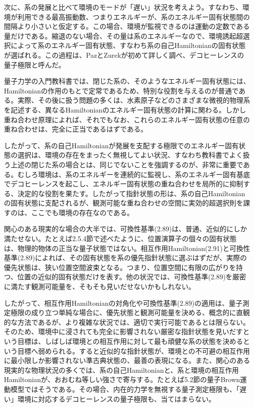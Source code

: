 \hypertarget{srcpage:81}{}\label{srcpage:81}
次に、系の発展と比べて環境のモードが「遅い」状況を考えよう。すなわち、環境が利用できる最高振動数、つまりエネルギーが、系のエネルギー固有状態間の間隔より小さいと仮定する。この場合、環境が監視できるのは運動の定数である量だけである。縮退のない場合、その量は系のエネルギーなので、環境誘起超選択によって系のエネルギー固有状態、すなわち系の自己Hamiltonianの固有状態が選ばれる。この過程は、PazとZurek\cite{ref103}が初めて詳しく調べ、デコヒーレンスの量子極限と呼んだ。

量子力学の入門教科書では、閉じた系の、そのようなエネルギー固有状態には、Hamiltonianの作用のもとで定常であるため、特別な役割を与えるのが普通である。実際、その後に扱う問題の多くは、水素原子などのさまざまな微視的物理系を記述する、異なるHamiltonianのエネルギー固有状態の計算に関わる。しかし重ね合わせ原理によれば、それでもなお、これらのエネルギー固有状態の任意の重ね合わせは、完全に正当であるはずである。

したがって、系の自己Hamiltonianが発展を支配する極限でのエネルギー固有状態の選択は、環境の存在をまったく無視してよい状況、すなわち教科書でよく扱う上述の閉じた系の場合とは、同じでないことを強調するのが、非常に重要である。むしろ環境は、系のエネルギーを連続的に監視し、系のエネルギー固有基底でデコヒーレンスを起こし、エネルギー固有状態の重ね合わせを局所的に抑制する、決定的な役割を果たす。したがって指針状態の形は、系の自己Hamiltonianの固有状態に支配されるが、観測可能な重ね合わせの空間に実効的超選択則を課すのは、ここでも環境の存在なのである。

関心のある現実的な場合の大半では、可換性基準(2.89)は、普通、近似的にしか満たせない\cite{ref084,ref086}。たとえば2.5.4節で述べたように、位置演算子の個々の固有状態は、物理的物体の正当な量子状態ではない。相互作用Hamiltonian(2.91)と可換性基準(2.89)によれば、その固有状態を系の優先指針状態に選ぶはずだが、実際の優先状態は、狭い位置空間波束となる。つまり、位置空間に有限の広がりを持つ、位置の近似的固有状態だけを表す。他の状況では、可換性基準(2.89)を厳密に満たす観測可能量を、そもそも見いだせないかもしれない。

\hypertarget{srcpage:82}{}\label{srcpage:82}
したがって、相互作用Hamiltonianの対角化や可換性基準(2.89)の適用は、量子測定極限の成り立つ単純な場合に、優先状態と観測可能量を決める、概念的に直観的な方法であるが、より複雑な状況では、適切で実行可能であるとは限らない。そのため、環境中に浸されても完全に影響されない厳密な指針状態を見いだすという目標は、しばしば環境との相互作用に対して最も頑健な系の状態を決めるという目標へ弱められる。すると近似的な指針状態が、環境との不可避の相互作用に最小限しか影響されない準古典状態の、最善の表現になる。また、関心のある現実的な物理状況の多くでは、系の自己Hamiltonianと、系と環境の相互作用Hamiltonianが、おおむね等しい強さで寄与する。たとえば5.2節の量子Brown運動模型ではそうである。その場合、内在的力学を無視する量子測定極限も、「遅い」環境に対応するデコヒーレンスの量子極限も、当てはまらない。

